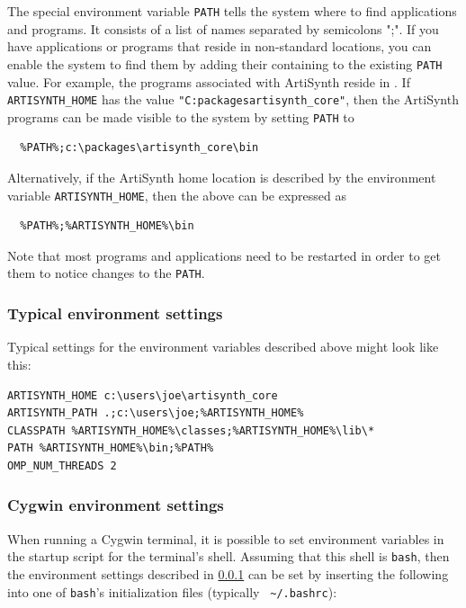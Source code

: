 The special environment variable {\tt PATH} tells the system where to find
applications and programs. It consists of a list of \directory{} names
separated by semicolons ";". If you have applications or programs that
reside in non-standard locations, you can enable the system to find
them by adding their containing \directory{} to the existing {\tt PATH}
value. For example, the programs associated with ArtiSynth reside in
. If {\tt ARTISYNTH\_HOME} has the value
{\tt "C:\SEP packages\SEP artisynth\_core"}, then the ArtiSynth programs
can be made visible to the system by setting {\tt PATH} to

\begin{verbatim}
  %PATH%;c:\packages\artisynth_core\bin
\end{verbatim}

Alternatively, if the ArtiSynth home location is described by
the environment variable {\tt ARTISYNTH\_HOME}, then the
above can be expressed as

\begin{verbatim}
  %PATH%;%ARTISYNTH_HOME%\bin
\end{verbatim}

Note that most programs and applications need to be restarted in order
to get them to notice changes to the {\tt PATH}.

\subsubsection{Typical environment settings}
\label{TypicalEnvironment}

Typical settings for the environment variables described above might
look like this:

\begin{lstlisting}[]
ARTISYNTH_HOME c:\users\joe\artisynth_core
ARTISYNTH_PATH .;c:\users\joe;%ARTISYNTH_HOME%
CLASSPATH %ARTISYNTH_HOME%\classes;%ARTISYNTH_HOME%\lib\*
PATH %ARTISYNTH_HOME%\bin;%PATH%
OMP_NUM_THREADS 2
\end{lstlisting}

\subsubsection{Cygwin environment settings}
\label{CygwinEnvironmentSettings}

When running a Cygwin terminal, it is possible to set environment
variables in the startup script for the terminal's shell. Assuming
that this shell is {\tt bash}, then the environment settings described
in \ref{TypicalEnvironment} can be set by inserting the following
into one of {\tt bash}'s initialization files (typically {\tt
\textasciitilde/.bashrc}):

